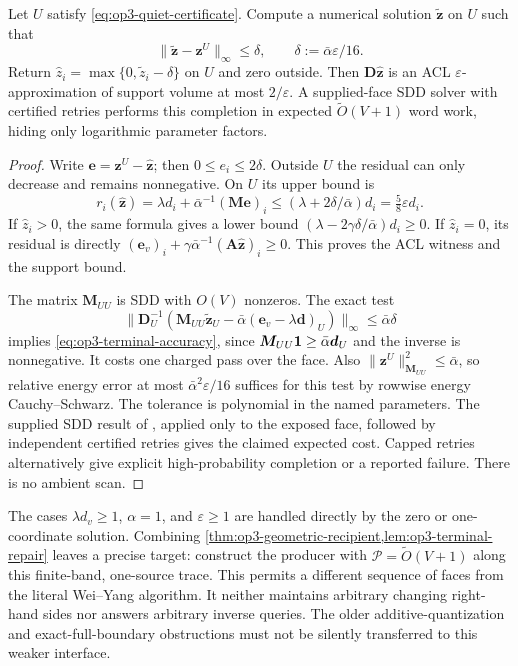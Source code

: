 \begin{lemma}
\label{lem:op3-terminal-repair}
Let $U$ satisfy \cref{eq:op3-quiet-certificate}. Compute a numerical
solution $\widetilde{\bm z}$ on $U$ such that
\begin{equation}
 \|\widetilde{\bm z}-\bm z^U\|_\infty\leq\delta,
 \qquad \delta:=\bar\alpha\varepsilon/16.
 \label{eq:op3-terminal-accuracy}
\end{equation}
Return $\widehat z_i=\max\{0,\widetilde z_i-\delta\}$ on $U$ and zero
outside. Then $\bm D\widehat{\bm z}$ is an ACL $\varepsilon$-approximation
of support volume at most $2/\varepsilon$. A supplied-face SDD solver with
certified retries performs this completion in expected
$\widetilde O(V+1)$ word work, hiding only logarithmic parameter factors.
\end{lemma}
\begin{proof}
Write $\bm e=\bm z^U-\widehat{\bm z}$; then $0\leq e_i\leq2\delta$.
Outside $U$ the residual can only decrease and remains nonnegative.
On $U$ its upper bound is
\[
 r_i(\widehat{\bm z})
 =\lambda d_i+\bar\alpha^{-1}(\bm M\bm e)_i
 \leq(\lambda+2\delta/\bar\alpha)d_i
 =\tfrac58\varepsilon d_i.
\]
If $\widehat z_i>0$, the same formula gives a lower bound
$(\lambda-2\gamma\delta/\bar\alpha)d_i\geq0$.
If $\widehat z_i=0$, its residual is directly
$(\bm e_v)_i+\gamma\bar\alpha^{-1}(\bm A\widehat{\bm z})_i\geq0$.
This proves the ACL witness and the support bound.

The matrix $\bm M_{UU}$ is SDD with $O(V)$ nonzeros. The exact test
\[
 \|\bm D_U^{-1}(\bm M_{UU}\widetilde{\bm z}_U
       -\bar\alpha(\bm e_v-\lambda\bm d)_U)\|_\infty
 \leq\bar\alpha\delta
\]
implies \cref{eq:op3-terminal-accuracy}, since
$\bm M_{UU}\mathbf{1}\geq\bar\alpha\bm d_U$ and the inverse is nonnegative.
It costs one charged pass over the face. Also
$\|\bm z^U\|_{\bm M_{UU}}^2\leq\bar\alpha$, so relative energy error at
most $\bar\alpha^2\varepsilon/16$ suffices for this test by rowwise
energy Cauchy--Schwarz. The tolerance is polynomial in the named parameters.
The supplied SDD result of \citet{koutis2011nearly}, applied only to the
exposed face, followed by independent certified retries gives the claimed
expected cost. Capped retries alternatively give explicit high-probability
completion or a reported failure. There is no ambient scan.
\end{proof}

The cases $\lambda d_v\geq1$, $\alpha=1$, and $\varepsilon\geq1$ are
handled directly by the zero or one-coordinate solution. Combining
\cref{thm:op3-geometric-recipient,lem:op3-terminal-repair} leaves a precise
\statusopen{} target: construct the producer with
$\mathcal P=\widetilde O(V+1)$ along this finite-band, one-source trace.
This permits a different sequence of faces from the literal Wei--Yang
algorithm. It neither maintains arbitrary changing right-hand sides nor
answers arbitrary inverse queries. The older additive-quantization and
exact-full-boundary obstructions must not be silently transferred to this
weaker interface.

